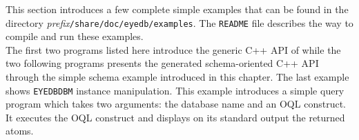 







This section introduces a few complete simple examples that can be found
in the directory
\emph{prefix}\texttt{/share/doc/eyedb/examples}.
The \texttt{README} file describes the way to compile and run these examples.
\\
The first two programs listed here introduce the generic C++ API of
\eyedb while the two following programs presents the
generated schema-oriented C++ API through the simple schema example introduced
in this chapter. The last example shows \texttt{EYEDBDBM} instance
manipulation.
This example introduces a simple query program which takes
two arguments: the database name and an OQL construct. It executes
the OQL construct and displays on its standard output the returned
atoms.
\verbsize
